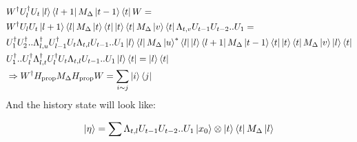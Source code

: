 \documentclass[manuscript,screen,review]{acmart}
\begin{document}
\begin{equation*}
  \begin{split}
    & W^{\dagger}U_{l}^{\dagger}U_{t}\ket{l}\bra{l+1}M_{\Delta}\ket{t-1}\bra{t}W = \\
    & W^{\dagger}U_{l}U_{t}\ket{l+1}\bra{l}M_{\Delta}\ket{t}\bra{t}\ket{t}\bra{t}M_{\Delta}\ket{v}\bra{t}\Lambda_{t,v}U_{t-1}U_{t-2}..U_{1} = \\
    & U_{1}^{\dagger}U_{2}^{\dagger}.. \Lambda_{l,u}^{\dagger}  U_{l-1}^{\dagger}U_{t}\Lambda_{t,l}U_{t-1}.. U_{1} \ket{l}\bra{l}M_{\Delta}\ket{u}^{*}\bra{l}\ket{l}\bra{l+1} M_{\Delta}\ket{t-1} \bra{t}\ket{t}\bra{t} M_{\Delta}\ket{v} \ket{l}\bra{t} \\
    & U_{1}^{\dagger} .. U_{l}^{\dagger} \Lambda^{\dagger}_{l,t} U_{l}^{\dagger}U_{t} \Lambda_{t,l} U_{t-1} .. U_{1} \ket{l}\bra{t} = \ket{l}\bra{t} \\ 
    &\Rightarrow  W^{\dagger}H_{\text{prop}} M_{\Delta} H_{\text{prop}} W = \sum_{i\sim j}\ket{i}\bra{j}
  \end{split}
\end{equation*}
And the history state will look like:

\begin{equation*}
  \begin{split}
    \ket{\eta} =  \sum \Lambda_{t,l}U_{t-1}U_{t-2}..U_{1}   \ket{x_{0}} \otimes  \ket{t} \bra{t} M_{\Delta} \ket{l}
  \end{split}
\end{equation*}
\end{document}
